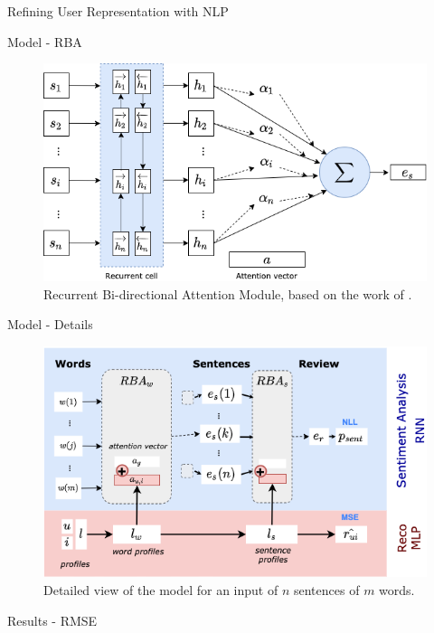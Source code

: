 \begin{section}{Refining User Representation with NLP}
\begin{frame}{Model - RBA}
    \begin{figure}
        \centering
        \includegraphics[height=.7\textheight]{img/RBA.png}
        \caption{Recurrent Bi-directional Attention Module, based on the work of \cite{yang2016hierarchical}.}
        \label{fig:coriaOverview}
    \end{figure}
\end{frame}

\begin{frame}{Model - Details}
    \begin{figure}
        \centering
        \includegraphics[height=.8\textheight]{img/globalArchOverviewCoria.png}
        \caption{ \centering Detailed view of the model for an input of $n$ sentences of $m$ words.}
        \label{fig:coriaOverview}
    \end{figure}
\end{frame}

\begin{frame}{Results - RMSE}
    
\end{frame}
%     


\end{section}
